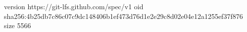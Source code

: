version https://git-lfs.github.com/spec/v1
oid sha256:4b25db7c86c07c9dc148406b1ef473d76d1e2e29c8d02e04e12a1255ef37f876
size 5566
